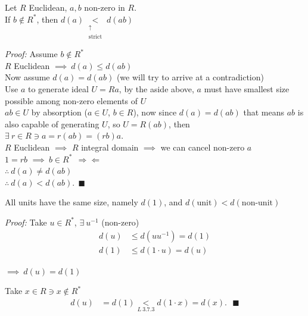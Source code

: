 \begin{lemma}
    Let $R$ Euclidean, $a,b$ non-zero in $R$. \\
    \noindent If $b\not\in R^*$, then $d(a) \underset{\substack{\uparrow \\ \text{strict}}}{<}d(ab)$
    \\ \steezybreak

    \noindent \textit{Proof:} Assume $b\not\in R^*$ \\
    $R$ Euclidean $\implies \ d(a)\leq d(ab)$ \\
    Now assume $d(a)=d(ab)$ (we will try to arrive at a contradiction) \\
    Use $a$ to generate ideal $U=Ra$, by the aside above, $a$ must have smallest size possible among
    non-zero elements of $U$ \\
    $ab\in U$ by absorption ($a\in U$, $b\in R$), now since $d(a)=d(ab)$ that means $ab$ is also
    capable of generating $U$, so $U=R(ab)$, then $\exists \ r\in R \ni a=r(ab)=(rb)a$. \\
    $R$ Euclidean $\implies$ $R$ integral domain $\implies$ we can cancel non-zero $a$ \\
    $1=rb$ $\implies \ b\in R^* \ \ \Rightarrow \Leftarrow$ \\
    $\therefore \ d(a)\neq d(ab)$ \\
    $\therefore \ d(a)<d(ab). \ \ \blacksquare$
\end{lemma}
\setcounter{dummy_lemma}{2}
\begin{corollary}
    All units have the same size, namely $d(1)$, and $d(\text{unit})<d(\text{non-unit})$ \\
    \steezybreak

    \noindent \textit{Proof: }
    Take $u\in R^*$, $\exists \ u^{-1}$ (non-zero) \\
    \begin{align*}
        d(u)&\leq d(uu^{-1})=d(1)\\
        d(1)&\leq d(1\cdot u) = d(u)
    \end{align*}

    $\implies \ d(u)=d(1)$ \\ \steezybreak

    \noindent Take $x\in R \ni x\not \in R^*$
    \begin{align*}
        d(u)&=d(1) \underset{L \ 3.7.3}{<}d(1\cdot x) = d(x). \ \ \ \blacksquare
    \end{align*}
\end{corollary}

